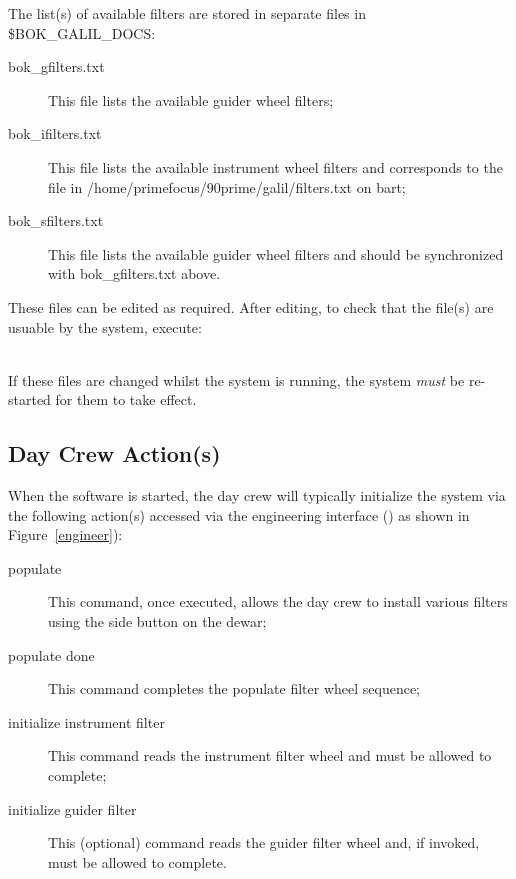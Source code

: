 \documentclass[12pt,twoside]{article}
\begin{document}
\noindent The list(s) of available filters are stored in separate files in \$BOK\_GALIL\_DOCS:

\begin{description}
 \item[bok\_gfilters.txt] This file lists the available guider wheel filters;
 \item[bok\_ifilters.txt] This file lists the available instrument wheel filters and corresponds to the file in
                          /home/primefocus/90prime/galil/filters.txt on {\sc bart};
 \item[bok\_sfilters.txt] This file lists the available guider wheel filters and should be synchronized with 
                          bok\_gfilters.txt above.
\end{description}

\noindent These files can be edited as required. After editing, to check that the file(s) are usuable by the system, execute: \\




 \\

\noindent If these files are changed whilst the system is running, the system \emph{must} be re-started for them to take effect.

\subsection{Day Crew Action(s)}
\label{daycrewactions}

\noindent When the software is started, the day crew will typically initialize the system via the following action(s)
accessed via the engineering interface () as shown in Figure~\ref{engineer}):

\begin{description}
 \item[{\sc populate}] This command, once executed, allows the day crew to install various filters using the side 
                       button on the dewar;
 \item[{\sc populate done}] This command completes the populate filter wheel sequence;
 \item[{\sc initialize instrument filter}] This command reads the instrument filter wheel and must be allowed to complete;
 \item[{\sc initialize guider filter}] This (optional) command reads the guider filter wheel and, if invoked, must be allowed 
                                       to complete.
\end{description}
\end{document}
